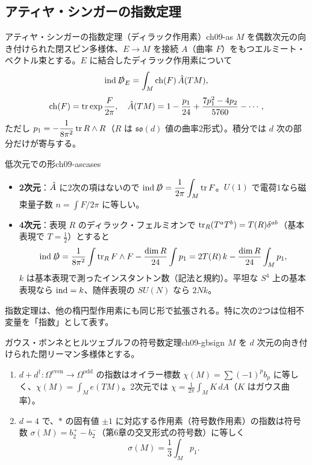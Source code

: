 \subsection{アティヤ・シンガーの指数定理}

\begin{mythm}{アティヤ・シンガーの指数定理（ディラック作用素）}{ch09-as}
$M$ を偶数次元の向き付けられた閉スピン多様体、$E\to M$ を接続 $A$（曲率 $F$）をもつエルミート・ベクトル束とする。$E$ に結合したディラック作用素について
\[
\operatorname{ind}\slashed D_E=\int_M\operatorname{ch}(F)\,\hat{A}(TM),
\]
\[
\operatorname{ch}(F)=\tr\exp\frac{F}{2\pi},\quad \hat{A}(TM)=1-\frac{p_1}{24}+\frac{7p_1^2-4p_2}{5760}-\cdots,
\]
ただし $p_1=-\dfrac{1}{8\pi^2}\tr R\wedge R$（$R$ は $\mathfrak{so}(d)$ 値の曲率2形式）。積分では $d$ 次の部分だけが寄与する。
\end{mythm}

\begin{myex}{低次元での形}{ch09-ascases}
\begin{itemize}
\item \textbf{2次元}：$\hat{A}$ に2次の項はないので $\displaystyle\operatorname{ind}\slashed D=\frac{1}{2\pi}\int_M\tr F$。$U(1)$ で電荷1なら磁束量子数 $n=\int F/2\pi$ に等しい。
\item \textbf{4次元}：表現 $R$ のディラック・フェルミオンで $\tr_R(T^aT^b)=T(R)\delta^{ab}$（基本表現で $T=\tfrac12$）とすると
\[
\operatorname{ind}\slashed D=\frac{1}{8\pi^2}\int\tr_RF\wedge F-\frac{\dim R}{24}\int p_1=2T(R)\,k-\frac{\dim R}{24}\int_Mp_1 ,
\]
$k$ は基本表現で測ったインスタントン数（記法と規約）。平坦な $S^4$ 上の基本表現なら $\operatorname{ind}=k$、随伴表現の $SU(N)$ なら $2Nk$。
\end{itemize}
\end{myex}

指数定理は、他の楕円型作用素にも同じ形で拡張される。特に次の2つは位相不変量を「指数」として表す。

\begin{mythm}{ガウス・ボンネとヒルツェブルフの符号数定理}{ch09-gbsign}
$M$ を $d$ 次元の向き付けられた閉リーマン多様体とする。
\begin{enumerate}
\item $d+d^\dagger\colon\Omega^{\text{even}}\to\Omega^{\text{odd}}$ の指数はオイラー標数 $\chi(M)=\sum(-1)^pb_p$ に等しく、$\chi(M)=\int_Me(TM)$。2次元では $\displaystyle\chi=\frac{1}{2\pi}\int_MK\,dA$（$K$ はガウス曲率）。
\item $d=4$ で、$*$ の固有値 $\pm1$ に対応する作用素（符号数作用素）の指数は符号数 $\sigma(M)=b_2^+-b_2^-$（第6章の交叉形式の符号数）に等しく
\[
\sigma(M)=\frac13\int_Mp_1 .
\]
\end{enumerate}
\end{mythm}

